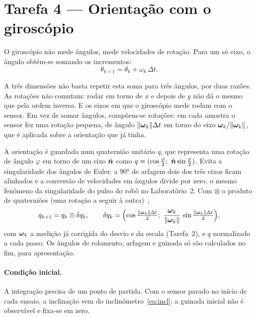 \section{Tarefa 4 --- Orientação com o giroscópio}
\label{sec:gyro}

O giroscópio não mede ângulos, mede velocidades de rotação. Para um só eixo,
o ângulo obtém-se somando os incrementos:
\begin{equation}
\theta_{k+1} = \theta_k + \omega_k\,\Delta t .
\label{eq:int1d}
\end{equation}

A três dimensões não basta repetir esta soma para três ângulos, por duas
razões. As rotações não comutam: rodar em torno de $x$ e depois de $y$ não dá
o mesmo que pela ordem inversa. E os eixos em que o giroscópio mede rodam com
o sensor. Em vez de somar ângulos, compõem-se rotações: em cada amostra o
sensor fez uma rotação pequena, de ângulo $\lVert\boldsymbol{\omega}_k\rVert\Delta t$
em torno do eixo $\boldsymbol{\omega}_k/\lVert\boldsymbol{\omega}_k\rVert$, que é aplicada
sobre a orientação que já tinha.

A orientação é guardada num quaternião unitário $q$, que representa uma
rotação de ângulo $\varphi$ em torno de um eixo $\hat{\boldsymbol{n}}$ como
$q = (\cos\tfrac{\varphi}{2};\ \hat{\boldsymbol{n}}\sin\tfrac{\varphi}{2})$. Evita a
singularidade dos ângulos de Euler: a \ang{90} de arfagem dois dos três eixos
ficam alinhados e a conversão de velocidades em ângulos divide por zero, o
mesmo fenómeno da singularidade do pulso do robô no Laboratório~2. Com
$\otimes$ o produto de quaterniões (uma rotação a seguir à
outra)~\cite{titterton2004},
\begin{equation}
q_{k+1} = q_k \otimes \delta q_k, \qquad
\delta q_k = \Bigl(\cos\tfrac{\lVert\boldsymbol{\omega}_k\rVert\Delta t}{2};\
\frac{\boldsymbol{\omega}_k}{\lVert\boldsymbol{\omega}_k\rVert}\,
\sin\tfrac{\lVert\boldsymbol{\omega}_k\rVert\Delta t}{2}\Bigr),
\label{eq:quat}
\end{equation}
com $\boldsymbol{\omega}_k$ a medição já corrigida do desvio e da escala
(Tarefa~2), e $q$ normalizado a cada passo. Os ângulos de rolamento, arfagem
e guinada só são calculados no fim, para apresentação.

\paragraph{Condição inicial.} A integração precisa de um ponto de partida. Com
o sensor parado no início de cada ensaio, a inclinação vem do
inclinómetro~\eqref{eq:incl}; a guinada inicial não é observável e fixa-se em
zero.

